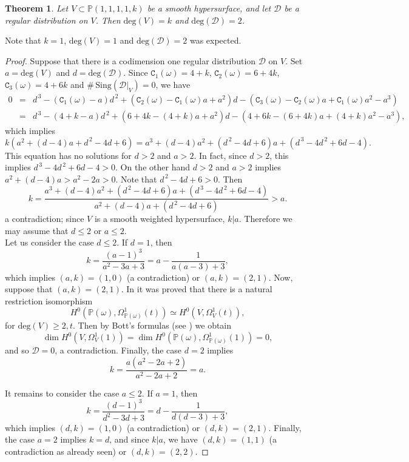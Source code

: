 \documentclass[11pt]{amsart}
\theoremstyle{plain}
\newtheorem{teo}{Theorem}[section]
\theoremstyle{definition}
\begin{document}
\vspace{0,1cm}

\begin{teo} \label{teo2} 
Let $V\subset\mathbb{P}(1,1,1,1,k)$ be a smooth hypersurface, and let
$\mathcal{D}$ be a regular distribution on $V$. Then $\mathrm{deg}(V)=k$ and $\mathrm{deg}(\mathcal{D})=2$.
\end{teo}
\noindent Note that $k=1$, $\mathrm{deg}(V)=1$ and $\mathrm{deg}(\mathcal{D})=2$ was expected.
\begin{proof} Suppose that there is a codimension one regular distribution $\mathcal{D}$ on $V$.
Set $a=\mathrm{deg}(V)$ and $d=\mathrm{deg}(\mathcal{D})$. Since $\texttt{C}_1(\omega)=4+k$, 
$\texttt{C}_2(\omega)=6+4k$, $\texttt{C}_3(\omega)=4+6k$ and $\#\,\mathrm{Sing}(\mathcal{D}|_V)=0$, we have
\begin{eqnarray*}
0&=&d^{\,3}-(\texttt{C}_1(\omega)-a)d^{\,2}+(\texttt{C}_2(\omega)-\texttt{C}_1(\omega)a+a^2)d
-(\texttt{C}_3(\omega)-\texttt{C}_2(\omega)a+\texttt{C}_1(\omega)a^2-a^3) \\
&=&d^{\,3}-(4+k-a)d^{\,2}+(6+4k-(4+k)a+a^2)d-(4+6k-(6+4k)a+(4+k)a^2-a^3),
\end{eqnarray*}
which implies 
$$k\left(a^2+(d-4)a+d^{\,2}-4d+6\right)=a^3+(d-4)a^2+(d^{\,2}-4d+6)a+(d^{\,3}-4d^{\,2}+6d-4).$$ 
This equation has no solutions for $d>2$ and $a>2$. In fact, since $d>2$, this implies $d^{\,3}-4d^{\,2}+6d-4>0$.  
On the other hand $d>2$ and $a>2$ implies $a^2+(d-4)a>a^2-2a>0$. Note that $d^{\,2}-4d+6>0$. Then
$$k=\frac{a^3+(d-4)a^2+(d^{\,2}-4d+6)a+(d^{\,3}-4d^{\,2}+6d-4)}{a^2+(d-4)a+(d^{\,2}-4d+6)}>a.$$
a contradiction; since $V$ is a smooth weighted hypersurface, $k|a$. Therefore we may assume that $d\leq 2$ or $a\leq 2$. \\

Let us consider the case $d\leq 2$. If $d=1$, then 
$$k=\frac{(a-1)^3}{a^2-3a+3}=a-\frac{1}{a(a-3)+3},$$ 
which implies $(a,k)=(1,0)$ (a contradiction) or $(a,k)=(2,1)$. Now, suppose that $(a,k)=(2,1)$. In \cite[Proposition 5.4]{Ca} 
it was proved that there is a natural restriction isomorphism 
$$H^{0}(\mathbb{P}(\omega), \Omega_{\mathbb{P}(\omega)}^1(t))\simeq H^{0}(V, \Omega_{V}^1(t)),$$ 
for $\mathrm{deg}(V)\geq2,t$. Then by Bott's formulas (see \cite{OSS}) we obtain  
$$\dim H^{0}(V, \Omega_{V}^1(1))=\dim H^{0}(\mathbb{P}(\omega), \Omega_{\mathbb{P}(\omega)}^1(1))=0,$$ 
and so $\mathcal{D}=0$, a contradiction. Finally, the case $d=2$ implies
$$k=\frac{a(a^2-2a+2)}{a^2-2a+2}=a.$$

It remains to consider the case $a\leq 2$. If $a=1$, then 
$$k=\frac{(d-1)^3}{d^2-3d+3}=d-\frac{1}{d(d-3)+3},$$ 
which implies $(d,k)=(1,0)$ (a contradiction) or $(d,k)=(2,1)$. Finally, the case $a=2$ implies $k=d$, and since $k|a$, we have 
$(d,k)=(1,1)$ (a contradiction as already seen) or $(d,k)=(2,2)$.
\end{proof}
\end{document}
